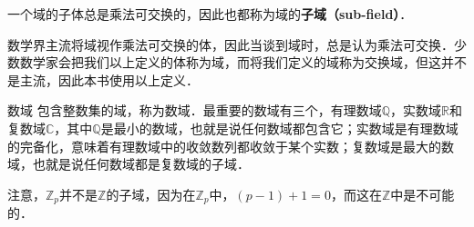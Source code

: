 一个域的子体总是乘法可交换的，因此也都称为域的\textbf{子域（sub-field）}．

数学界主流将域视作乘法可交换的体，因此当谈到域时，总是认为乘法可交换．少数数学家会把我们以上定义的体称为域，而将我们定义的域称为交换域，但这并不是主流，因此本书使用以上定义．

\begin{example}{数域}
包含整数集的域，称为数域．最重要的数域有三个，有理数域$\mathbb{Q}$，实数域$\mathbb{R}$和复数域$\mathbb{C}$，其中$\mathbb{Q}$是最小的数域，也就是说任何数域都包含它；实数域是有理数域的完备化，意味着有理数域中的收敛数列都收敛于某个实数；复数域是最大的数域，也就是说任何数域都是复数域的子域．

注意，$\mathbb{Z}_p$并不是$\mathbb{Z}$的子域，因为在$\mathbb{Z}_p$中，$(p-1)+1=0$，而这在$\mathbb{Z}$中是不可能的．
\end{example}

